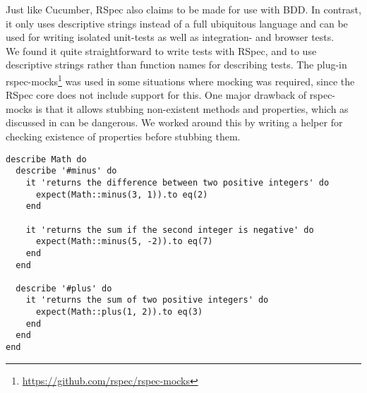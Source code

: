 
Just like Cucumber, RSpec also claims to be made for use with
BDD\cite{web:rspec}. In contrast, it only uses descriptive strings
instead of a full ubiquitous language and can be used for writing
isolated unit-tests as well as integration- and browser tests.\\

We found it quite straightforward to write tests with RSpec, and to use
descriptive strings rather than function names for describing tests. The
plug-in rspec-mocks\footnote{\url{https://github.com/rspec/rspec-mocks}}
was used in some situations where mocking was required, since the RSpec
core does not include support for this. One major drawback of rspec-
mocks is that it allows stubbing non-existent methods and properties,
which as discussed in  can be dangerous. We
worked around this by writing a helper for checking existence of
properties before stubbing them.\\

\begin{lstlisting}[caption=Example of RSpec tests for a module.,
                   label=lst:rspec, float=t]
describe Math do
  describe '#minus' do
    it 'returns the difference between two positive integers' do
      expect(Math::minus(3, 1)).to eq(2)
    end

    it 'returns the sum if the second integer is negative' do
      expect(Math::minus(5, -2)).to eq(7)
    end
  end

  describe '#plus' do
    it 'returns the sum of two positive integers' do
      expect(Math::plus(1, 2)).to eq(3)
    end
  end
end
\end{lstlisting}
